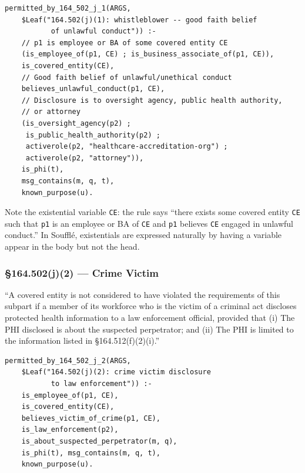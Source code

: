 \documentclass[11pt,letterpaper]{article}
\begin{document}
\begin{lstlisting}[style=soufflestyle,caption={\S 164.502(j)(1) --- whistleblower}]
permitted_by_164_502_j_1(ARGS,
    $Leaf("164.502(j)(1): whistleblower -- good faith belief
           of unlawful conduct")) :-
    // p1 is employee or BA of some covered entity CE
    (is_employee_of(p1, CE) ; is_business_associate_of(p1, CE)),
    is_covered_entity(CE),
    // Good faith belief of unlawful/unethical conduct
    believes_unlawful_conduct(p1, CE),
    // Disclosure is to oversight agency, public health authority,
    // or attorney
    (is_oversight_agency(p2) ;
     is_public_health_authority(p2) ;
     activerole(p2, "healthcare-accreditation-org") ;
     activerole(p2, "attorney")),
    is_phi(t),
    msg_contains(m, q, t),
    known_purpose(u).
\end{lstlisting}

\begin{designbox}
Note the existential variable \texttt{CE}: the rule says ``there exists some covered entity \texttt{CE} such that \texttt{p1} is an employee or BA of \texttt{CE} and \texttt{p1} believes \texttt{CE} engaged in unlawful conduct.'' In Souffl\'{e}, existentials are expressed naturally by having a variable appear in the body but not the head.
\end{designbox}

\subsubsection{\S 164.502(j)(2) --- Crime Victim}

\begin{hipaabox}
``A covered entity is not considered to have violated the requirements of this subpart if a member of its workforce who is the victim of a criminal act discloses protected health information to a law enforcement official, provided that (i) The PHI disclosed is about the suspected perpetrator; and (ii) The PHI is limited to the information listed in \S 164.512(f)(2)(i).''
\end{hipaabox}

\begin{lstlisting}[style=soufflestyle,caption={\S 164.502(j)(2) --- crime victim}]
permitted_by_164_502_j_2(ARGS,
    $Leaf("164.502(j)(2): crime victim disclosure
           to law enforcement")) :-
    is_employee_of(p1, CE),
    is_covered_entity(CE),
    believes_victim_of_crime(p1, CE),
    is_law_enforcement(p2),
    is_about_suspected_perpetrator(m, q),
    is_phi(t), msg_contains(m, q, t),
    known_purpose(u).
\end{lstlisting}
\end{document}
